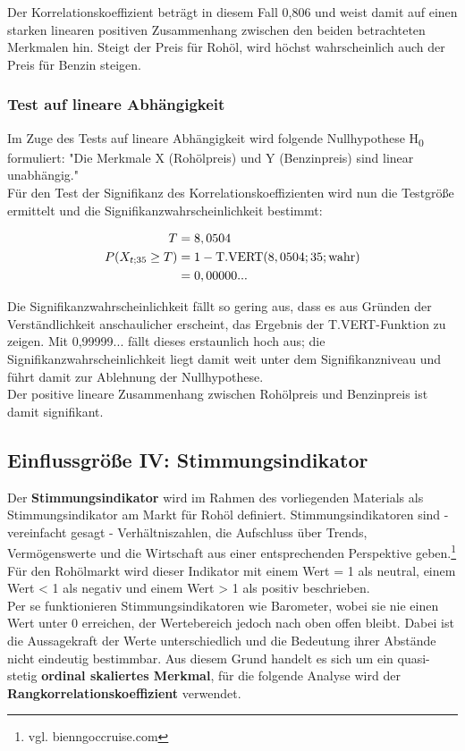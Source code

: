 Der Korrelationskoeffizient beträgt in diesem Fall 0,806 und weist damit auf einen starken linearen positiven Zusammenhang zwischen den beiden betrachteten Merkmalen hin. Steigt der Preis für Rohöl, wird höchst wahrscheinlich auch der Preis für Benzin steigen.

\subsubsection{Test auf lineare Abhängigkeit}
Im Zuge des Tests auf lineare Abhängigkeit wird folgende Nullhypothese H\textsubscript{0} formuliert: "Die Merkmale X (Rohölpreis) und Y (Benzinpreis) sind linear unabhängig."\\
Für den Test der Signifikanz des Korrelationskoeffizienten wird nun die Testgröße ermittelt und die Signifikanzwahrscheinlichkeit bestimmt:

\begin{align}
  T &= 8,0504\\
  P(X_{t;35} \geq T) &= 1 - \text{T.VERT}(8,0504; 35; \text{wahr})\\
                    &= 0,00000...
\end{align}

Die Signifikanzwahrscheinlichkeit fällt so gering aus, dass es aus Gründen der Verständlichkeit anschaulicher erscheint, das Ergebnis der T.VERT-Funktion zu zeigen. Mit 0,99999... fällt dieses erstaunlich hoch aus; die Signifikanzwahrscheinlichkeit liegt damit weit unter dem Signifikanzniveau und führt damit zur Ablehnung der Nullhypothese.\\
Der positive lineare Zusammenhang zwischen Rohölpreis und Benzinpreis ist damit signifikant.



\subsection{Einflussgröße IV: Stimmungsindikator}
Der \textbf{Stimmungsindikator} wird im Rahmen des vorliegenden Materials als Stimmungsindikator am Markt für Rohöl definiert. Stimmungsindikatoren sind - vereinfacht gesagt - Verhältniszahlen, die Aufschluss über Trends, Vermögenswerte und die Wirtschaft aus einer entsprechenden Perspektive geben.\footnote{vgl. bienngoccruise.com} Für den Rohölmarkt wird dieser Indikator mit einem Wert = 1 als neutral, einem Wert < 1 als negativ und einem Wert > 1 als positiv beschrieben.\\
Per se funktionieren Stimmungsindikatoren wie Barometer, wobei sie nie einen Wert unter 0 erreichen, der Wertebereich jedoch nach oben offen bleibt. Dabei ist die Aussagekraft der Werte unterschiedlich und die Bedeutung ihrer Abstände nicht eindeutig bestimmbar. Aus diesem Grund handelt es sich um ein quasi-stetig \textbf{ordinal skaliertes Merkmal}, für die folgende Analyse wird der \textbf{Rangkorrelationskoeffizient} verwendet.\\

